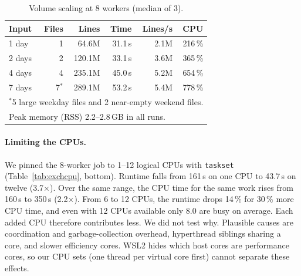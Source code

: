 \documentclass[sigconf,nonacm]{acmart}
\begin{document}
\begin{table}[t]
\caption{Volume scaling at 8 workers (median of 3).}\label{tab:volume}
\begin{tabular}{lrrrrr}
\toprule
Input & Files & Lines & Time & Lines/s & CPU \\
\midrule
1 day  & 1 &  64.6M & 31.1\,s & 2.1M & 216\,\% \\
2 days & 2 & 120.1M & 33.1\,s & 3.6M & 365\,\% \\
4 days & 4 & 235.1M & 45.0\,s & 5.2M & 654\,\% \\
7 days & 7$^\ast$ & 289.1M & 53.2\,s & 5.4M & 778\,\% \\
\bottomrule
\multicolumn{6}{l}{\footnotesize $^\ast$5 large weekday files and 2 near-empty weekend files.}\\
\multicolumn{6}{l}{\footnotesize Peak memory (RSS) 2.2--2.8\,GB in all runs.}\\
\end{tabular}
\end{table}

\paragraph{Limiting the CPUs.} We pinned the 8-worker job to 1--12 logical
CPUs with \texttt{taskset} (Table~\ref{tab:exchcpu}, bottom). Runtime falls from
161\,s on one CPU to 43.7\,s on twelve (3.7$\times$). Over the same range, the
CPU time for the same work rises from 160\,s to 350\,s (2.2$\times$).
From 6 to 12 CPUs, the runtime drops 14\,\% for 30\,\% more CPU time, and even
with 12 CPUs available only 8.0 are busy on average. Each added CPU therefore
contributes less. We did not test why. Plausible causes are coordination and
garbage-collection overhead, hyperthread siblings sharing a core, and slower
efficiency cores. WSL2 hides which host cores are performance cores, so our CPU
sets (one thread per virtual core first) cannot separate these effects.
\end{document}
